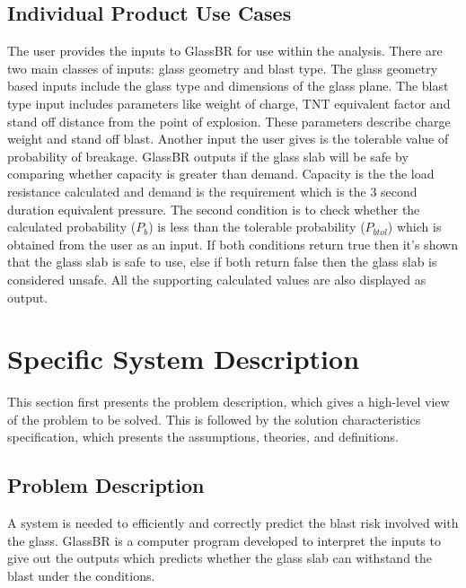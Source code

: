 \documentclass[12pt]{article}
\begin{document}
\subsection{Individual Product Use Cases}
\label{Sec:IndiProdUseCase}
The user provides the inputs to GlassBR for use within the analysis. There are two main classes of inputs: glass geometry and blast type. The glass geometry based inputs include the glass type and dimensions of the glass plane. The blast type input includes parameters like weight of charge, TNT equivalent factor and stand off distance from the point of explosion. These parameters describe charge weight and stand off blast. Another input the user gives is the tolerable value of probability of breakage. GlassBR outputs if the glass slab will be safe by comparing whether capacity is greater than demand. Capacity is the the load resistance calculated and demand is the requirement which is the 3 second duration equivalent pressure. The second condition is to check whether the calculated probability (${P_{b}}$) is less than the tolerable probability (${P_{btol}}$) which is obtained from the user as an input. If both conditions return true then it's shown that the glass slab is safe to use, else if both return false then the glass slab is considered unsafe. All the supporting calculated values are also displayed as output.
\section{Specific System Description}
\label{Sec:SpecSystDesc}
This section first presents the problem description, which gives a high-level view of the problem to be solved. This is followed by the solution characteristics specification, which presents the assumptions, theories, and definitions.
\subsection{Problem Description}
\label{Sec:ProbDesc}
A system is needed to efficiently and correctly predict the blast risk involved with the glass. GlassBR is a computer program developed to interpret the inputs to give out the outputs which predicts whether the glass slab can withstand the blast under the conditions.
\end{document}
